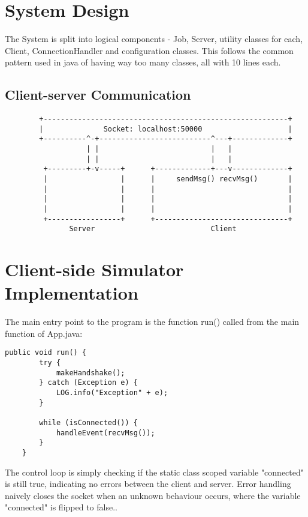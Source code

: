 \documentclass[a4paper]{article} %
\begin{document}
\section{System Design}
\label{sec:section3}
The System is split into logical components - Job, Server, utility classes for
each, Client, ConnectionHandler and configuration classes. This follows the
common pattern used in java of having way too many classes, all with 10 lines
each.
\subsection{Client-server Communication}
\begin{verbatim}
        +---------------------------------------------------------+
        |              Socket: localhost:50000                    |
        +----------^-+--------------------------^---+-------------+
                   | |                          |   |
                   | |                          |   |
         +---------+-v-----+      +-------------+---v-------------+
         |                 |      |     sendMsg() recvMsg()       |
         |                 |      |                               |
         |                 |      |                               |
         |                 |      |                               |
         +-----------------+      +-------------------------------+
               Server                           Client
\end{verbatim}

\section{Client-side Simulator Implementation}
\label{sec:section4}
The main entry point to the program is the function run() called from the main
function of App.java: 

\begin{lstlisting}
public void run() {
        try {
            makeHandshake();
        } catch (Exception e) {
            LOG.info("Exception" + e);
        }

        while (isConnected()) {
            handleEvent(recvMsg());
        }
    }
\end{lstlisting}

The control loop is simply checking if the static class scoped variable
"connected" is still true, indicating no errors between the client and server.
Error handling naively closes the socket when an unknown behaviour occurs, where
the variable "connected" is flipped to false..
\end{document}

